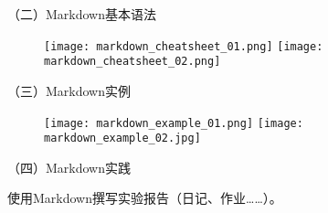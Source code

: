 \vspace{0.1in}
（二）Markdown基本语法
\begin{figure}[h]
  \centering
  \texttt{[image: markdown\_cheatsheet\_01.png]}
  \texttt{[image: markdown\_cheatsheet\_02.png]}
\end{figure}

\vspace{0.1in}
（三）Markdown实例
\begin{figure}[h]
  \centering
  \texttt{[image: markdown\_example\_01.png]}
  \texttt{[image: markdown\_example\_02.jpg]}
\end{figure}

\vspace{0.1in}
（四）Markdown实践

使用Markdown撰写实验报告（日记、作业……）。
